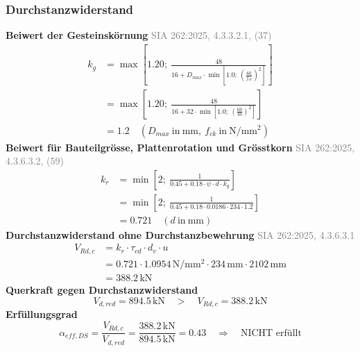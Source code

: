 \documentclass[11pt,a4paper]{article}
\newcommand{\normref}[1]{{\small\textcolor{gray}{#1}}}
\begin{document}
\subsubsection{Durchstanzwiderstand}
\noindent\textbf{Beiwert der Gesteinskörnung} \hfill \normref{SIA 262:2025, 4.3.3.2.1, (37)}
\begin{equation*}
\begin{aligned}
  k_g &= \max\left[1.20;\ \frac{48}{16 + D_{max} \cdot \min\left[1.0;\ \left(\frac{60}{f_{ck}}\right)^{2}\right]}\right] \\
  &= \max\left[1.20;\ \frac{48}{16 + 32 \cdot \min\left[1.0;\ \left(\frac{60}{30}\right)^{2}\right]}\right] \\
  &= 1.2 \quad \left(D_{max}\ \text{in}\ \mathrm{mm},\ f_{ck}\ \text{in}\ \mathrm{N}/\mathrm{mm}^{2}\right)
\end{aligned}
\end{equation*}
\noindent\textbf{Beiwert für Bauteilgrösse, Plattenrotation und Grösstkorn} \hfill \normref{SIA 262:2025, 4.3.6.3.2, (59)}
\begin{equation*}
\begin{aligned}
  k_r &= \min\left[2;\ \frac{1}{0.45 + 0.18 \cdot \psi \cdot d \cdot k_g}\right] \\
  &= \min\left[2;\ \frac{1}{0.45 + 0.18 \cdot 0.0186 \cdot 234 \cdot 1.2}\right] \\
  &= 0.721 \quad \left(d\ \text{in}\ \mathrm{mm}\right)
\end{aligned}
\end{equation*}
\noindent\textbf{Durchstanzwiderstand ohne Durchstanzbewehrung} \hfill \normref{SIA 262:2025, 4.3.6.3.1}
\begin{equation*}
\begin{aligned}
  V_{Rd,c} &= k_r \cdot \tau_{cd} \cdot d_v \cdot u \\
  &= 0.721 \cdot 1.0954\,\mathrm{N}/\mathrm{mm}^{2} \cdot 234\,\mathrm{mm} \cdot 2102\,\mathrm{mm} \\
  &= 388.2\,\mathrm{kN}
\end{aligned}
\end{equation*}
\noindent\textbf{Querkraft gegen Durchstanzwiderstand}
\begin{equation*}
V_{d,red} = 894.5\,\mathrm{kN} \quad > \quad V_{Rd,c} = 388.2\,\mathrm{kN}
\end{equation*}
\noindent\textbf{Erfüllungsgrad}
\begin{equation*}
\alpha_{eff,DS} = \frac{V_{Rd,c}}{V_{d,red}} = \frac{388.2\,\mathrm{kN}}{894.5\,\mathrm{kN}} = 0.43 \quad \Rightarrow \quad \text{NICHT erfüllt}
\end{equation*}
\end{document}
